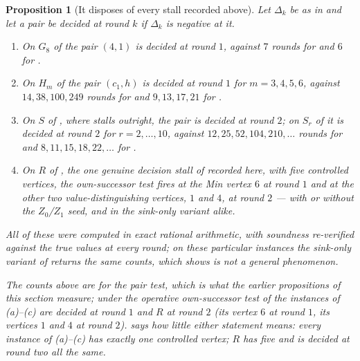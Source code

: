 \documentclass[11pt]{article}
\theoremstyle{plain}
\newtheorem{proposition}[theorem]{Proposition}
\theoremstyle{definition}
\begin{document}
\begin{proposition}[It disposes of every stall recorded above]\label{prop:hybrid-decides}
Let $\Delta_k$ be as in  and let a pair be
\emph{decided at round $k$} if $\Delta_k$ is negative at it.
\begin{enumerate}[label=(\alph*),leftmargin=2.2em]
\item On $G_8$ of  the pair $(4,1)$ is decided
      at round $1$, against $7$ rounds for  and $6$ for
      .
\item On $H_m$ of  the pair $(c_1,h)$ is decided at
      round $1$ for $m=3,4,5,6$, against $14,38,100,249$ rounds for
       and $9,13,17,21$ for .
\item On $S$ of , where 
      stalls outright, the pair is decided at round $2$; on $S_r$ of
       it is decided at round $2$ for
      $r=2,\dots,10$, against $12,25,52,104,210,\dots$ rounds for
       and $8,11,15,18,22,\dots$ for
      .
\item On $R$ of , the one genuine decision stall of
       recorded here, with five controlled vertices,
      the own-successor test fires at the Min vertex $6$ at round $1$ and
      at the other two value-distinguishing vertices, $1$ and $4$, at
      round $2$ --- with or without the $Z_0$/$Z_1$ seed, and in the
      sink-only variant alike.
\end{enumerate}
All of these were computed in exact rational arithmetic, with soundness
re-verified against the true values at every round; on these particular
instances the sink-only variant of  returns the same
counts, which  shows is not a general phenomenon.

The counts above are for the pair test, which is what the earlier propositions
of this section measure; under the operative own-successor test of
 the instances of (a)--(c) are decided at round $1$
and $R$ at round $2$ (its vertex $6$ at round $1$, its vertices $1$ and $4$
at round $2$).  says how little either statement means:
every instance of (a)--(c) has exactly one controlled vertex; $R$ has five
and is decided at round two all the same.
\end{proposition}
\end{document}
